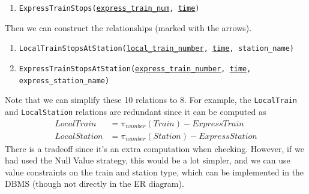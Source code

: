 \begin{example}
\begin{enumerate}
      \item \texttt{ExpressTrainStops(\underline{express\_train\_num}, \underline{time})}
    \end{enumerate}
    Then we can construct the relationships (marked with the arrows).  
    \begin{enumerate}
      \item \texttt{LocalTrainStopsAtStation(\underline{local\_train\_number}, \underline{time}, station\_name)}
      \item \texttt{ExpressTrainStopsAtStation(\underline{express\_train\_number}, \underline{time}, express\_station\_name)}
    \end{enumerate}
    Note that we can simplify these 10 relations to 8. For example, the \texttt{LocalTrain} and \texttt{LocalStation} relations are redundant since it can be computed as 
    \begin{align}
      LocalTrain & = \pi_{number} (Train) - ExpressTrain \\
      LocalStation & = \pi_{number} (Station) - ExpressStation
    \end{align}
    There is a tradeoff since it's an extra computation when checking. However, if we had used the Null Value strategy, this would be a lot simpler, and we can use value constraints on the train and station type, which can be implemented in the DBMS (though not directly in the ER diagram). 
  \end{example}

